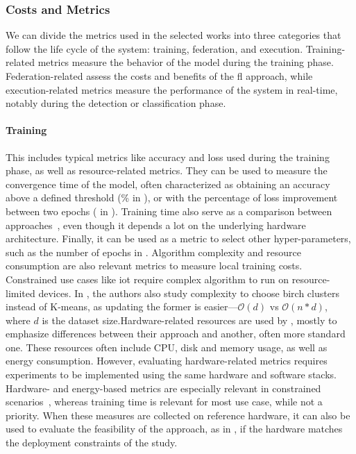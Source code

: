 \subsubsection{Costs and Metrics\label{sec:sota.quali.metrics}}

We can divide the metrics used in the selected works into three categories that follow the life cycle of the system: training, federation, and execution.
Training-related metrics measure the behavior of the model during the training phase.
Federation-related assess the costs and benefits of the \gls{fl} approach, while execution-related metrics measure the performance of the system in real-time, notably during the detection or classification phase.

\paragraph{Training}

This includes typical metrics like accuracy and loss used during the training phase, as well as resource-related metrics.
They can be used to measure the convergence time of the model, often characterized as obtaining an accuracy above a defined threshold (\% in \cite{chen_Networkanomalydetection_2020}), or with the percentage of loss improvement between two epochs ( in \cite{kim_CollaborativeAnomalyDetection_2020}). Training time also serve as a comparison between approaches~\cite{schneble_Attackdetectionusing_2019}, even though it depends a lot on the underlying hardware architecture. Finally, it can be used as a metric to select other hyper-parameters, such as the number of epochs in \cite{liu_BlockchainFederatedLearning_2021}.
Algorithm complexity and resource consumption are also relevant metrics to measure local training costs.
Constrained use cases like \gls{iot} require complex algorithm to run on resource-limited devices.
In \cite{pahl_AllEyesYou_2018}, the authors also study complexity to choose \gls{birch} clusters instead of K-means, as updating the former is easier---\(\mathcal{O}(d)\) vs \(\mathcal{O}(n*d)\), where \(d\) is the dataset size.Hardware-related resources are used by \cite{rathore_BlockSecIoTNetBlockchainbaseddecentralized_2019,zhao_MultiTaskNetworkAnomaly_2019}, mostly to emphasize differences between their approach and another, often more standard one.
These resources often include CPU, disk and memory usage, as well as energy consumption.
However, evaluating hardware-related metrics requires experiments to be implemented using the same hardware and software stacks.
Hardware- and energy-based metrics are especially relevant in constrained scenarios~\cite{nguyen_DIoTFederatedSelflearning_2019,schneble_Attackdetectionusing_2019}, whereas training time is relevant for most use case, while not a priority.
When these measures are collected on reference hardware, it can also be used to evaluate the feasibility of the approach, as in \cite{nguyen_DIoTFederatedSelflearning_2019}, if the hardware matches the deployment constraints of the study.

